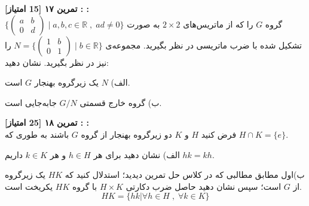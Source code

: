 \documentclass{article}
\newenvironment{exercise}[3][\unskip]{%
	\par
	\noindent
	\textbf{تمرین
		#1
		[#2 امتیاز] 
		\def\temp{#3}\ifx\temp\empty
		: 
		\else
		: #3 \vspace{0.5em} \\ \noindent
		\fi
}}{}
\begin{document}
\begin{exercise}[۱۷]{15}{}
گروه 
$G$ 
را که از ماتریس‌های 
$2\times 2$ 
به صورت 
$\biggl\{\begin{pmatrix}
		a & b \\
		0 & d 
\end{pmatrix}
\;\Big|\; a,b,c \in \mathbb{R}\; ,\; ad \neq 0
\biggr\}
$
تشکیل شده با ضرب ماتریسی در نظر بگیرید.
مجموعه‌ی 
$N=\biggl\{\begin{pmatrix}
		1 & b \\
		0 & 1 
\end{pmatrix}\;\Big| \; b\in \mathbb{R}\biggr\}$ 
را نیز در نظر بگیرید. 
نشان دهید: 

\noindent
الف) 
$N$ 
یک زیرگروه بهنجار 
$G$ 
است. 

\noindent
ب) گروه خارج قسمتی
$G/N$ 
جابه‌جایی
است.
\end{exercise}


\begin{exercise}[۱۸]{25}{}
فرض کنید 
$H$ 
و 
$K$ 
دو زیرگروه بهنجار از گروه 
$G$ 
باشند به طوری که 
$H \cap K = \{e\}$. 

\noindent
الف)‌ نشان دهید برای هر 
$h \in H$ 
و هر 
$k \in K$ 
داریم 
$hk=kh$.

\noindent
ب)اول مطابق مطالبی که در کلاس حل تمرین دیدید؛ استدلال کنید که 
$HK$
یک زیرگروه از $G$ است؛ سپس  
 نشان دهید حاصل ضرب دکارتی 
$H \times K$ 
با گروه 
$HK$ 
یکریخت است. 
\begin{equation*}
HK=\{hk | \forall h \in H \; , \; \forall k \in K \}
\end{equation*}

\end{exercise}

\vspace{1em}
\end{document}

